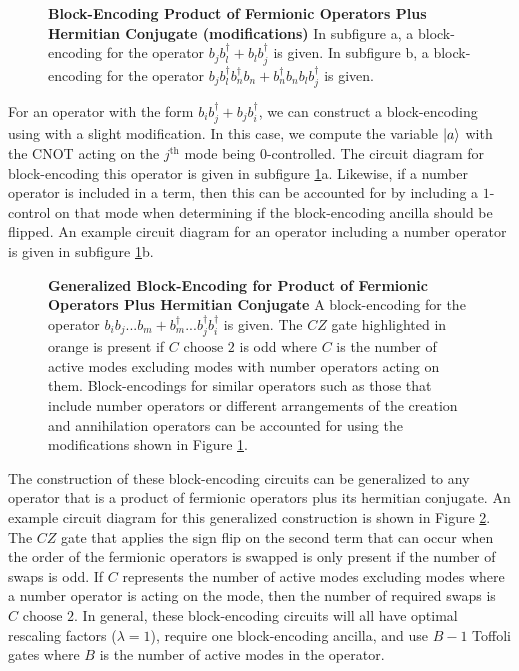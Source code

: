 \begin{figure}
    
    
    \caption{
        \textbf{Block-Encoding Product of Fermionic Operators Plus Hermitian Conjugate (modifications)}
        In subfigure a, a block-encoding for the operator $b_j b_l^\dagger + b_l b_j^\dagger$ is given.
        In subfigure b, a block-encoding for the operator $b_j b_l^\dagger b_n^\dagger b_n + b_n^\dagger b_n b_l b_j^\dagger$ is given.
    }
    \label{fig:fermionic-be-lc-modifications}
\end{figure}

For an operator with the form $b_i b_j^\dagger + b_j b_i^\dagger$, we can construct a block-encoding using with a slight modification.
In this case, we compute the variable $\ket{a}$ with the CNOT acting on the $j^\text{th}$ mode being $0$-controlled.
The circuit diagram for block-encoding this operator is given in subfigure \ref{fig:fermionic-be-lc-modifications}a.
Likewise, if a number operator is included in a term, then this can be accounted for by including a $1$-control on that mode when determining if the block-encoding ancilla should be flipped.
An example circuit diagram for an operator including a number operator is given in subfigure \ref{fig:fermionic-be-lc-modifications}b.

\begin{figure}
    
    \caption{
        \textbf{Generalized Block-Encoding for Product of Fermionic Operators Plus Hermitian Conjugate}
        A block-encoding for the operator $b_i b_j ... b_m + b_m^\dagger ... b_j^\dagger b_i^\dagger$ is given.
        The $CZ$ gate highlighted in orange is present if $C \text{ choose } 2$ is odd where $C$ is the number of active modes excluding modes with number operators acting on them.
        Block-encodings for similar operators such as those that include number operators or different arrangements of the creation and annihilation operators can be accounted for using the modifications shown in Figure \ref{fig:fermionic-be-lc-modifications}.
    }
    \label{fig:fermionic-be-lc}
\end{figure}

The construction of these block-encoding circuits can be generalized to any operator that is a product of fermionic operators plus its hermitian conjugate.
An example circuit diagram for this generalized construction is shown in Figure \ref{fig:fermionic-be-lc}.
The $CZ$ gate that applies the sign flip on the second term that can occur when the order of the fermionic operators is swapped is only present if the number of swaps is odd.
If $C$ represents the number of active modes excluding modes where a number operator is acting on the mode, then the number of required swaps is $C \text{ choose } 2$.
In general, these block-encoding circuits will all have optimal rescaling factors ($\lambda=1$), require one block-encoding ancilla, and use $B-1$ Toffoli gates where $B$ is the number of active modes in the operator.

